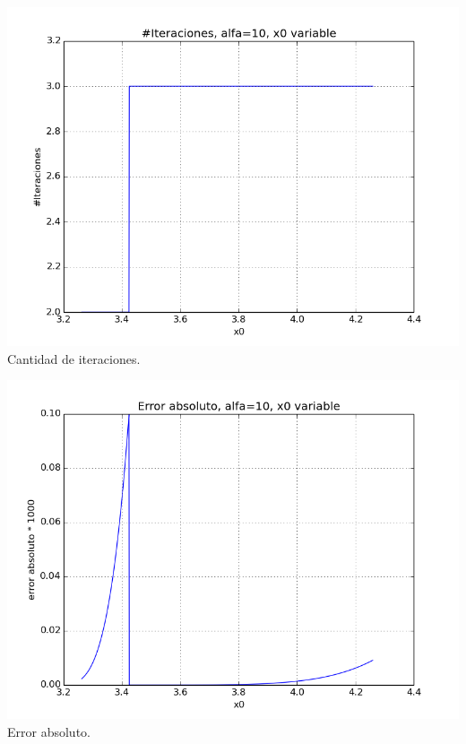 \begin{center}
\includegraphics[scale=0.5]{graficos/iteraciones-f-newton-alfa_fijo-absoluto-0.0001-alejando_cercano.png}\\
Cantidad de iteraciones.
\end{center}

\begin{center}
\includegraphics[scale=0.5]{graficos/x0s-f-newton-alfa_fijo-absoluto-0.0001-alejando_cercano.png}\\
Error absoluto.
\end{center}


